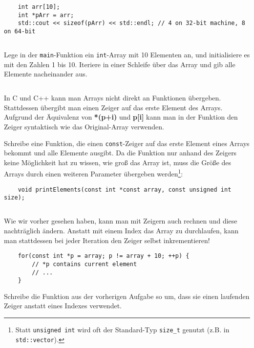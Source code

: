 \begin{lstlisting}
	int arr[10];
	int *pArr = arr;
	std::cout << sizeof(pArr) << std::endl; // 4 on 32-bit machine, 8 on 64-bit
\end{lstlisting}

\subsection{}
Lege in der \texttt{main}-Funktion ein \texttt{int}-Array mit 10 Elementen an, und initialisiere es mit den Zahlen 1 bis 10.
Iteriere in einer Schleife über das Array und gib alle Elemente nacheinander aus.

\subsection{}
In C und C++ kann man Arrays nicht direkt an Funktionen übergeben.
Stattdessen übergibt man einen Zeiger auf das erste Element des Arrays. Aufgrund der Äquivalenz von \textbf{*(p+i) } und \textbf{p[i]} kann man in der Funktion den Zeiger syntaktisch wie das Original-Array verwenden.

Schreibe eine Funktion, die einen \texttt{const}-Zeiger auf das erste Element eines Arrays bekommt und alle Elemente ausgibt.
Da die Funktion nur anhand des Zeigers keine Möglichkeit hat zu wissen, wie groß das Array ist, muss die Größe des Arrays durch einen weiteren Parameter übergeben werden\footnote{Statt \texttt{unsigned int} wird oft der Standard-Typ \texttt{size\_t} genutzt (z.B. in \texttt{std::vector}).}:

\begin{lstlisting}
	void printElements(const int *const array, const unsigned int size);
\end{lstlisting}

\subsection{}
Wie wir vorher gesehen haben, kann man mit Zeigern auch rechnen und diese nachträglich ändern.
Anstatt mit einem Index das Array zu durchlaufen, kann man stattdessen bei jeder Iteration den Zeiger selbst inkrementieren!

\begin{lstlisting}
	for(const int *p = array; p != array + 10; ++p) {
		// *p contains current element
		// ...
	}
\end{lstlisting}

Schreibe die Funktion aus der vorherigen Aufgabe so um, dass sie einen laufenden Zeiger anstatt eines Indexes verwendet.


